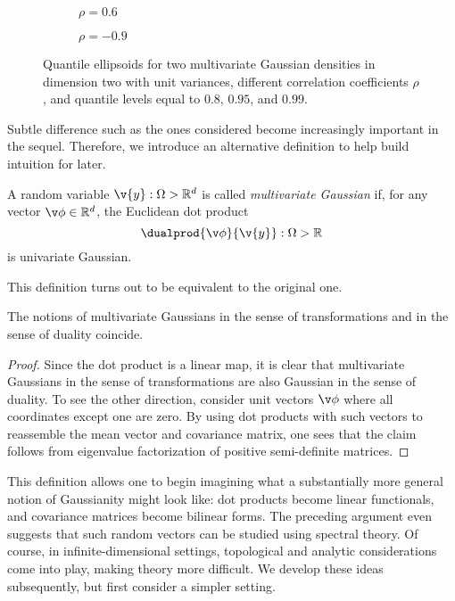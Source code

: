 \documentclass[11pt]{book}
\begin{document}
\begin{figure}
\begin{subfigure}{0.49\textwidth}

\caption{$\rho = 0.6$}
\end{subfigure}
\begin{subfigure}{0.49\textwidth}

\caption{$\rho = -0.9$}
\end{subfigure}
\caption{Quantile ellipsoids for two multivariate Gaussian densities in dimension two with unit variances, different correlation coefficients $\rho$, and quantile levels equal to $0.8$, $0.95$, and $0.99$.}
\label{fig:mvn-contour}
\end{figure}

Subtle difference such as the ones considered become increasingly important in the sequel.
Therefore, we introduce an alternative definition to help build intuition for later.

\begin{definition}
A random variable $\v{y} : \Omega \-> \R^d$ is called \emph{multivariate Gaussian} if, for any vector $\v\phi \in \R^d$, the Euclidean dot product 
\[
\dualprod{\v\phi}{\v{y}} : \Omega \-> \R 
\]
is univariate Gaussian.
\end{definition}

This definition turns out to be equivalent to the original one.

\begin{proposition}
The notions of multivariate Gaussians in the sense of transformations and in the sense of duality coincide.
\end{proposition}

\begin{proof}
Since the dot product is a linear map, it is clear that multivariate Gaussians in the sense of transformations are also Gaussian in the sense of duality.
To see the other direction, consider unit vectors $\v\phi$ where all coordinates except one are zero. 
By using dot products with such vectors to reassemble the mean vector and covariance matrix, one sees that the claim follows from eigenvalue factorization of positive semi-definite matrices.
\end{proof}

This definition allows one to begin imagining what a substantially more general notion of Gaussianity might look like: dot products become linear functionals, and covariance matrices become bilinear forms.
The preceding argument even suggests that such random vectors can be studied using spectral theory.
Of course, in infinite-dimensional settings, topological and analytic considerations come into play, making theory more difficult.
We develop these ideas subsequently, but first consider a simpler setting.
\end{document}
